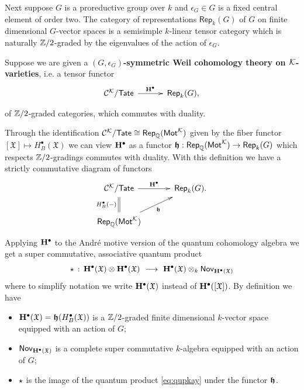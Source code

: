 \documentclass[twoside,leqno]{article}
\numberwithin{equation}{section}
\theoremstyle{plain}
\theoremstyle{definition}
\begin{document}
Next suppose $G$ is a proreductive group over $k$ and $\epsilon_{G}
\in G$ is a fixed central element of order two.  The category of
representations $\mathsf{Rep}_{k}(G)$ of $G$ on finite dimensional
$G$-vector spaces is a semisimple $k$-linear tensor category which is
naturally $\mathbb Z/2$-graded by the eigenvalues of the action of
$\epsilon_{G}$.

Suppose we are given a
    {\bfseries $(G,\epsilon_{G})$-symmetric Weil cohomology theory on
      $\mathcal K$-varieties}, i.e. a tensor functor
\begin{equation} \label{eq:GWeil}
  \xymatrix@R-2.5pc@M+0.2pc@C+0.5pc{
 \CA{\kay}/\mathsf{Tate} \ar[r]^-{\bfH^{\bullet}}  &
  \mathsf{Rep}_{k}(G),
}
\end{equation}
of $\mathbb Z/2$-graded categories, which commutes with duality. 


Through the identification $\mathcal{C}^{\mathcal K}/\mathsf{Tate} \cong
\mathsf{Rep}_{\mathbb Q}(\mathsf{Mot}^{\mathcal K})$ given by the fiber functor \linebreak 
$[\mathfrak{X}] \mapsto H^{\bullet}_{B}(\mathfrak{X})$ we can view
$\mathbf{H}^{\bullet}$ as a functor $\boldsymbol{\mathfrak{h}}
:\mathsf{Rep}_{\mathbb Q}(\mathsf{Mot}^{\mathcal K}) \to \mathsf{Rep}_{k}(G)$ which
respects $\mathbb Z/2$-gradings commutes with duality. With this definition
we have a strictly commutative diagram of functors
\[
 \xymatrix@R-0.5pc@M+0.2pc@C+0.5pc{
 \CA{\kay}/\mathsf{Tate} \ar[r]^-{\bfH^{\bullet}}  \ar@{=}[d]_-{H^{\bullet}_{B}(-)} &
 \mathsf{Rep}_{k}(G).
 \\
 \mathsf{Rep}_{\bbQ}(\motM^{\kay}) \ar[ru]_-{\bfh} &}
\]
Applying $\mathbf{H}^{\bullet}$ to the Andr\'{e} motive version of the quantum
cohomology algebra we get a super commutative,  associative quantum product
\begin{equation} \label{eq:qupGk}
 \star \, : \, \mathbf{H}^{\bullet}(\mathfrak{X})\otimes \mathbf{H}^{\bullet}(\mathfrak{X})
 \ \longrightarrow \ \mathbf{H}^{\bullet}(\mathfrak{X}) \otimes_{k}
 \mathsf{Nov}_{\mathbf{H}^{\bullet}(\mathfrak{X})}
\end{equation}
where to simplify notation we write $\mathbf{H}^{\bullet}(\mathfrak{X})$ instead of
$\mathbf{H}^{\bullet}([\mathfrak{X}])$. By definition we have
\begin{itemize}
\item $\mathbf{H}^{\bullet}(\mathfrak{X}) =
  \boldsymbol{\mathfrak{h}}(H^{\bullet}_{B}(\mathfrak{X}))$ is a $\mathbb Z/2$-graded
  finite dimensional $k$-vector
space equipped with an action of $G$;
\item $\mathsf{Nov}_{\mathbf{H}^{\bullet}(\mathfrak{X})}$ is
  a complete super commutative $k$-algebra
  equipped with an action of $G$;
\item $\star$ is the image of the quantum product \eqref{eq:qupkay} under the
  functor $\boldsymbol{\mathfrak{h}}$.
\end{itemize}
\end{document}

